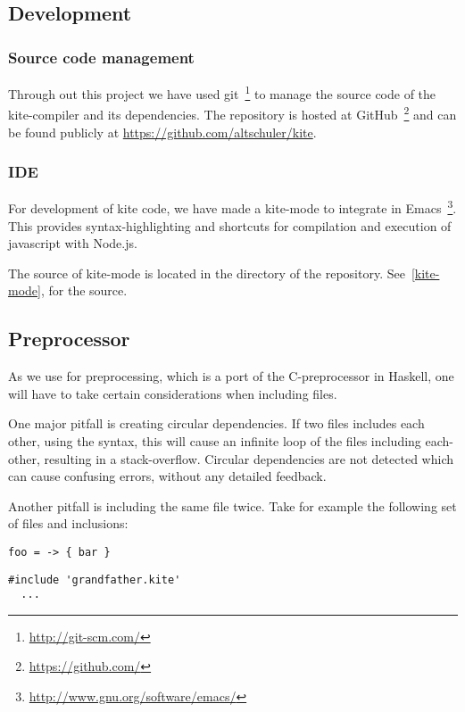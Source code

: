 
\subsection{Development}
\subsubsection{Source code management}
Through out this project we have used
git~\footnote{\url{http://git-scm.com/}} to manage the source code of
the kite-compiler and its dependencies. The repository is hosted at
GitHub~\footnote{\url{https://github.com/}} and can be found publicly at
\url{https://github.com/altschuler/kite}.

\subsubsection{IDE}
For development of kite code, we have made a kite-mode to integrate in
Emacs~\footnote{\url{http://www.gnu.org/software/emacs/}}. This
provides syntax-highlighting and shortcuts for compilation and
execution of javascript with Node.js.

The source of kite-mode is located in the  directory of
the repository. See~\ref{kite-mode}, for the source.


\subsection{Preprocessor}
As we use \cite{wallace04} for preprocessing, which is a
port of the C-preprocessor in Haskell, one will have to take certain
considerations when including files.

One major pitfall is creating circular dependencies. If two files includes
each other, using the  syntax, this will
cause an infinite loop of the files including each-other, resulting in
a stack-overflow. Circular dependencies are not detected which can
cause confusing errors, without any detailed feedback.

Another pitfall is including the same file twice. Take for example the
following set of files and inclusions:

\begin{lstlisting}[caption=\code{grandfather.kite}]
  foo = -> { bar }
\end{lstlisting}

\begin{lstlisting}[caption=\code{father.kite}]
  #include 'grandfather.kite'
  ...
\end{lstlisting}

